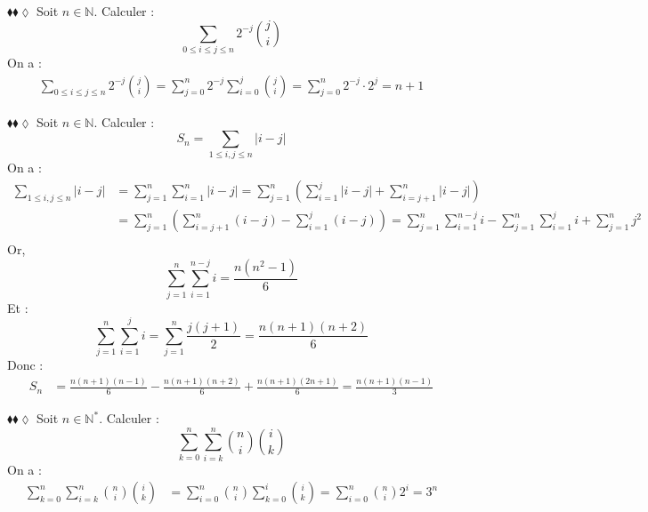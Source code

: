 \documentclass[11pt]{article}
\begin{document}
\begin{exercice}{$\blacklozenge\blacklozenge\lozenge$}{}
    Soit $n\in\mathbb{N}$. Calculer :
    \begin{equation*}
        \sum\limits_{0\leq{i}\leq{j}\leq{n}}{2^{-j}\binom{j}{i}}
    \end{equation*}
    \tcblower
    On a :
    \begin{align*}
        \sum\limits_{0\leq{i}\leq{j}\leq{n}}{2^{-j}\binom{j}{i}}=\sum\limits^{n}_{j=0}{2^{-j}\sum\limits^{j}_{i=0}{\binom{j}{i}}}=\sum\limits^{n}_{j=0}{2^{-j}\cdot2^j}=n+1
    \end{align*}
\end{exercice}

\begin{exercice}{$\blacklozenge\blacklozenge\lozenge$}{}
    Soit $n\in\mathbb{N}$. Calculer :
    \begin{equation*}
        S_n = \sum\limits_{1\leq i,j\leq n}{|i-j|}
    \end{equation*}
    \tcblower
    On a :
    \begin{align*}
        \sum\limits_{1\leq i,j\leq n}{|i-j|}&=\sum\limits^{n}_{j=1}{\sum\limits^{n}_{i=1}{|i-j|}}=\sum\limits^{n}_{j=1}{\left(\sum\limits^{j}_{i=1}{|i-j|}+\sum\limits^{n}_{i=j+1}{|i-j|}\right)}\\
        &=\sum\limits^{n}_{j=1}{\left(\sum\limits^{n}_{i=j+1}{(i-j)}-\sum\limits^{j}_{i=1}{(i-j)}\right)}=\sum\limits^{n}_{j=1}{\sum\limits^{n-j}_{i=1}{i}-\sum\limits^{n}_{j=1}\sum\limits^{j}_{i=1}{i}+\sum\limits^n_{j=1}j^2}\\
    \end{align*}
    Or,
    \begin{equation*}
        \sum^n_{j=1}{\sum^{n-j}_{i=1}{i}}=\frac{n(n^2-1)}{6}
    \end{equation*}
    Et :
    \begin{equation*}
        \sum^n_{j=1}\sum^j_{i=1}{i}=\sum^n_{j=1}{\frac{j(j+1)}{2}}=\frac{n(n+1)(n+2)}{6}
    \end{equation*}
    Donc :
    \begin{align*}
        S_n &= \frac{n(n+1)(n-1)}{6} - \frac{n(n+1)(n+2)}{6} + \frac{n(n+1)(2n+1)}{6} = \frac{n(n+1)(n-1)}{3}
    \end{align*}
\end{exercice}

\begin{exercice}{$\blacklozenge\blacklozenge\lozenge$}{}
    Soit $n\in\mathbb{N}^*$. Calculer :
    \begin{equation*}
        \sum^n_{k=0}\sum^n_{i=k}{\binom{n}{i}\binom{i}{k}}
    \end{equation*}
    \tcblower
    On a :
    \begin{align*}
        \sum^n_{k=0}\sum^n_{i=k}{\binom{n}{i}\binom{i}{k}}&=\sum^n_{i=0}\binom{n}{i}\sum^i_{k=0}\binom{i}{k}=\sum^n_{i=0}\binom{n}{i}2^i=3^n
    \end{align*}
\end{exercice}
\end{document}
